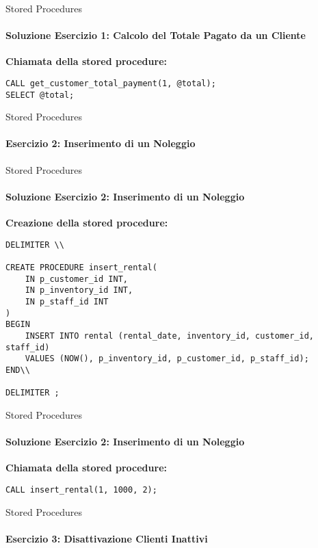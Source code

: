 %
\begin{frame}[fragile]{Stored Procedures}
\framesubtitle{Soluzione Esercizio 1: Calcolo del Totale Pagato da un Cliente}
\consegnaSPsExOne

\vspace{.2cm}

\textbf{Chiamata della stored procedure:}
\begin{lstlisting}
CALL get_customer_total_payment(1, @total);
SELECT @total;
\end{lstlisting}
\end{frame}
%
\begin{frame}[fragile]{Stored Procedures}
\framesubtitle{Esercizio 2: Inserimento di un Noleggio}
\consegnaSPsExTwo
\end{frame}
%
\begin{frame}[fragile]{Stored Procedures}
\framesubtitle{Soluzione Esercizio 2: Inserimento di un Noleggio}

\vspace{-.5cm}

\textbf{Creazione della stored procedure:}
\begin{lstlisting}
DELIMITER \\

CREATE PROCEDURE insert_rental(
    IN p_customer_id INT,
    IN p_inventory_id INT,
    IN p_staff_id INT
)
BEGIN
    INSERT INTO rental (rental_date, inventory_id, customer_id, staff_id)
    VALUES (NOW(), p_inventory_id, p_customer_id, p_staff_id);
END\\

DELIMITER ;
\end{lstlisting}
\end{frame}
%
\begin{frame}[fragile]{Stored Procedures}
\framesubtitle{Soluzione Esercizio 2: Inserimento di un Noleggio}
\consegnaSPsExOne

\vspace{.2cm}

\textbf{Chiamata della stored procedure:}
\begin{lstlisting}
CALL insert_rental(1, 1000, 2);
\end{lstlisting}
\end{frame}
%
\begin{frame}[fragile]{Stored Procedures}
\framesubtitle{Esercizio 3: Disattivazione Clienti Inattivi}
\consegnaSPsExThree
\end{frame}
%
